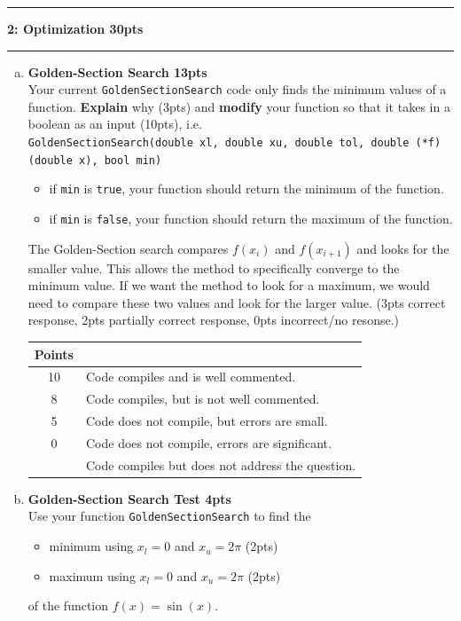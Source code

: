 \documentclass[11pt]{article}
\newcommand\question[2]{\vspace{.25in}\hrule\textbf{#1: #2}\vspace{.5em}\hrule\vspace{.10in}}
\begin{document}
\newpage
\question{2}{Optimization \color{red} 30pts}
\begin{enumerate}[(a)]
	\item \textbf{Golden-Section Search \color{red} 13pts}\\
	Your current \texttt{GoldenSectionSearch} code only finds the minimum values of a function. \textbf{Explain} why \color{red} (3pts) \color{black} and \textbf{modify} your function so that it takes in a boolean as an input \color{red}(10pts)\color{black}, i.e.\\ \texttt{GoldenSectionSearch(double xl, double xu, double tol, double (*f)(double x), bool min)}  
	\begin{itemize}
		\item if \texttt{min} is \texttt{true}, your function should return the minimum of the function.
		\item if \texttt{min} is \texttt{false}, your function should return the maximum of the function.
	\end{itemize}
	\color{red}The Golden-Section search compares $f(x_i)$ and $f(x_{i+1})$ and looks for the smaller value. This allows the method to specifically converge to the minimum value. If we want the method to look for a maximum, we would need to compare these two values and look for the larger value. (3pts correct response, 2pts partially correct response, 0pts incorrect/no resonse.)
	
	\begin{table}[H]
		\centering
		\color{red}
		\begin{tabular}{| c | l |}
			\hline
			Points & \\
			\hline
			10 & Code compiles and is well commented. \\
			\hline
			8 & Code compiles, but is not well commented. \\
			\hline
			5 & Code does not compile, but errors are small. \\
			\hline
			0 & Code does not compile, errors are significant. \\
			  & Code compiles but does not address the question.\\
			  \hline
		\end{tabular}
	\end{table}
	\color{black}
	\item \textbf{Golden-Section Search Test \color{red} 4pts}\\
	Use your function \texttt{GoldenSectionSearch} to find the 
	\begin{itemize}
		\item minimum using $x_l = 0$ and $x_u = 2\pi$ \color{red}(2pts)\color{black}
		\item maximum using $x_l = 0$ and $x_u = 2\pi$ \color{red}(2pts)\color{black}
	\end{itemize}
	of the function $f(x) = \sin(x)$.
	

\end{enumerate}
\end{document}
